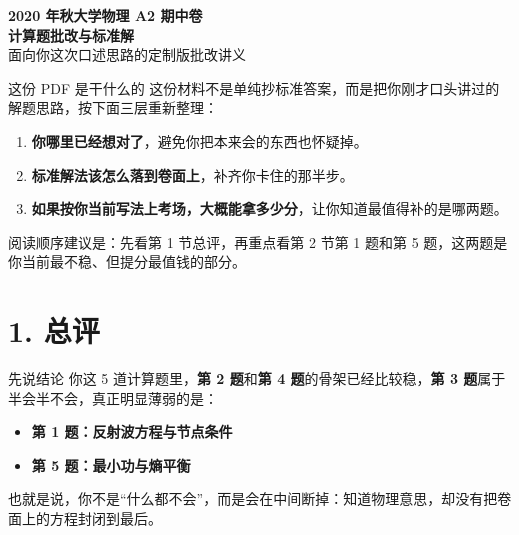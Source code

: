 \documentclass[11pt,a4paper]{ctexart}
\newcommand{\key}[1]{\textcolor{theme}{\textbf{#1}}}
\begin{document}
\begin{center}
{\bfseries 2020 年秋大学物理 A2 期中卷\\[4pt]
计算题批改与标准解}\\[8pt]
{\large 面向你这次口述思路的定制版批改讲义}
\end{center}

\vspace{4mm}

\begin{summarybox}{这份 PDF 是干什么的}
这份材料不是单纯抄标准答案，而是把你刚才口头讲过的解题思路，按下面三层重新整理：
\begin{enumerate}
  \item \key{你哪里已经想对了}，避免你把本来会的东西也怀疑掉。
  \item \key{标准解法该怎么落到卷面上}，补齐你卡住的那半步。
  \item \key{如果按你当前写法上考场，大概能拿多少分}，让你知道最值得补的是哪两题。
\end{enumerate}
阅读顺序建议是：先看第 1 节总评，再重点看第 2 节第 1 题和第 5 题，这两题是你当前最不稳、但提分最值钱的部分。
\end{summarybox}

\section*{1. 总评}

\begin{goodbox}{先说结论}
你这 5 道计算题里，\key{第 2 题}和\key{第 4 题}的骨架已经比较稳，\key{第 3 题}属于半会半不会，真正明显薄弱的是：
\begin{itemize}
  \item \key{第 1 题：反射波方程与节点条件}
  \item \key{第 5 题：最小功与熵平衡}
\end{itemize}
也就是说，你不是“什么都不会”，而是会在中间断掉：知道物理意思，却没有把卷面上的方程封闭到最后。
\end{goodbox}
\end{document}
